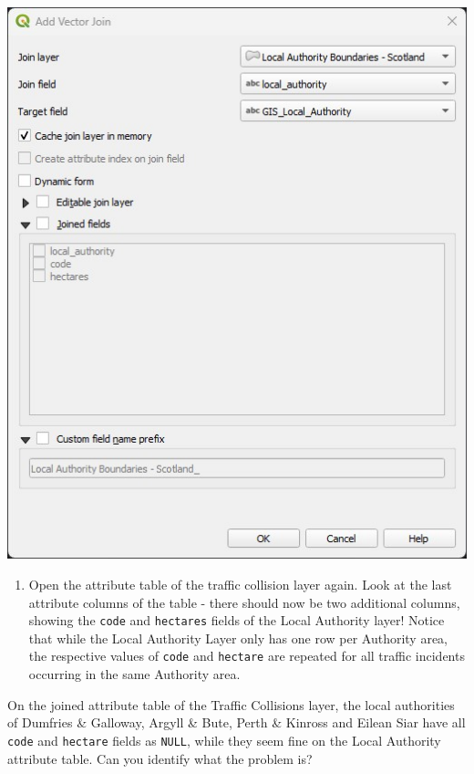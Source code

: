 \documentclass[
  letterpaper,
  DIV=11,
  numbers=noendperiod]{scrreprt}
\providecommand{\tightlist}{%
  \setlength{\itemsep}{0pt}\setlength{\parskip}{0pt}}\usepackage{longtable,booktabs,array}
\begin{document}
\includegraphics{images/lab_11/lab_11_fig_4_newjoin.jpg}

\begin{enumerate}
\def\labelenumi{(\arabic{enumi})}
\setcounter{enumi}{313}
\tightlist
\item
  Open the attribute table of the traffic collision layer again. Look at
  the last attribute columns of the table - there should now be two
  additional columns, showing the \texttt{code} and \texttt{hectares}
  fields of the Local Authority layer! Notice that while the Local
  Authority Layer only has one row per Authority area, the respective
  values of \texttt{code} and \texttt{hectare} are repeated for all
  traffic incidents occurring in the same Authority area.
\end{enumerate}

\begin{tcolorbox}[enhanced jigsaw, coltitle=black, toprule=.15mm, breakable, opacitybacktitle=0.6, left=2mm, colback=white, leftrule=.75mm, rightrule=.15mm, colbacktitle=quarto-callout-important-color!10!white, toptitle=1mm, titlerule=0mm, colframe=quarto-callout-important-color-frame, arc=.35mm, bottomtitle=1mm, opacityback=0, bottomrule=.15mm, title=\textcolor{quarto-callout-important-color}{\faExclamation}\hspace{0.5em}{Stop and Think}]

On the joined attribute table of the Traffic Collisions layer, the local
authorities of Dumfries \& Galloway, Argyll \& Bute, Perth \& Kinross
and Eilean Siar have all \texttt{code} and \texttt{hectare} fields as
\texttt{NULL}, while they seem fine on the Local Authority attribute
table. Can you identify what the problem is?

\end{tcolorbox}
\end{document}
